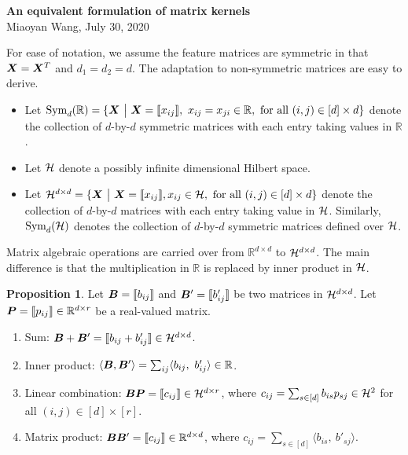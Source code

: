 \documentclass[11pt]{article}
\theoremstyle{plain}
\theoremstyle{definition}
\newtheorem{prop}{Proposition}
\begin{document}
\begin{center}
{\bf \Large An equivalent formulation of matrix kernels}\\
Miaoyan Wang, July 30, 2020\\
\end{center}

For ease of notation, we assume the feature matrices are symmetric in that $\bm X=\bm X^T$ and $d_1=d_2=d$. The adaptation to non-symmetric matrices are easy to derive. 
\begin{itemize}
\item Let $\text{Sym}_d(\mathbb{R})=\{\mX\ \big|\ \mX=\entry{x_{ij}},\ x_{ij}=x_{ji}\in\mathbb{R},\ \text{for all }(i,j)\in[d]\times d\}$ denote the collection of $d$-by-$d$ symmetric matrices with each entry taking values in $\mathbb{R}$. 
\item Let $\mathcal{H}$ denote a possibly infinite dimensional Hilbert space.
\item Let $\tH^{d\times d}=\{\mX\ \big| \ \mX=\entry{x_{ij}},x_{ij}\in\tH,\ \text{for all }(i,j)\in[d]\times d\}$ denote the collection of $d$-by-$d$ matrices with each entry taking value in $\mathcal{H}$. Similarly, $\text{Sym}_d(\mathcal{H})$ denotes the collection of $d$-by-$d$ symmetric matrices defined over $\mathcal{H}$.
\end{itemize}

Matrix algebraic operations are carried over from $\mathbb{R}^{d\times d}$ to $\mathcal{H}^{d\times d}$. The main difference is that the multiplication in $\mathbb{R}$ is replaced by inner product in $\mathcal{H}$. 

\begin{prop} Let $\bm B=\llbracket b_{ij} \rrbracket$ and $\bm B'=\llbracket b'_{ij} \rrbracket$ be two matrices in $\mathcal{H}^{d\times d}$.  Let $\bm{P}=\llbracket p_{ij} \rrbracket\in\mathbb{R}^{d\times r}$ be a real-valued matrix.
\begin{enumerate}
\item Sum: $\bm B+\bm B'=\llbracket b_{ij}+b'_{ij} \rrbracket\in\mathcal{H}^{d\times d}$.
\item Inner product: $\langle \bm B,\bm B'\rangle=\sum_{ij}\langle b_{ij},\ b'_{ij}\rangle \in\mathbb{R}$.
\item Linear combination: $\bm B\bm{P}=\llbracket c_{ij} \rrbracket\in\mathcal{H}^{d\times r}$, where $c_{ij}=\sum_{s\in[d]}b_{is}p_{sj} \in \mathcal{H}^2$ for all $(i,j)\in[d]\times[r]$.
\item Matrix product: $\bm B\bm B'=\llbracket c_{ij} \rrbracket \in \mathbb{R}^{d\times d}$, where $c_{ij}=\sum_{s\in[d]}\langle b_{is},\ b'_{sj}\rangle$. 
\end{enumerate}
\end{prop}
\end{document}
